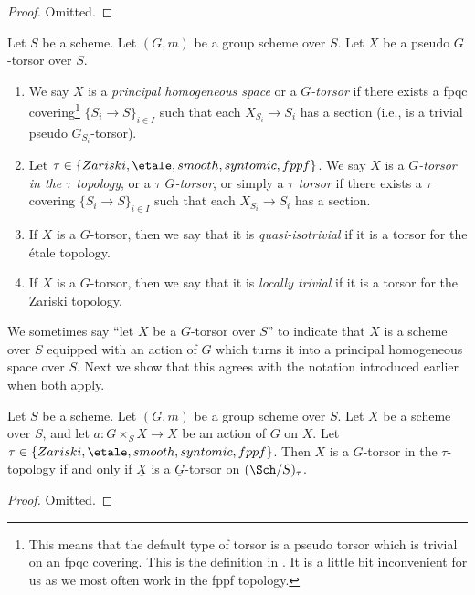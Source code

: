 \begin{proof}
Omitted.
\end{proof}

\begin{definition}
\label{definition-principal-homogeneous-space}
Let $S$ be a scheme.
Let $(G, m)$ be a group scheme over $S$.
Let $X$ be a pseudo $G$-torsor over $S$.
\begin{enumerate}
\item We say $X$ is a {\it principal homogeneous space}
or a {\it $G$-torsor} if there exists a fpqc covering\footnote{This means
that the default type of torsor is a pseudo torsor which is trivial on an
fpqc covering. This is the definition in \cite[Expos\'e IV, 6.5]{SGA3}.
It is a little bit inconvenient for us as we most often work in the fppf
topology.}
$\{S_i \to S\}_{i \in I}$ such that each
$X_{S_i} \to S_i$ has a section (i.e., is a trivial pseudo $G_{S_i}$-torsor).
\item Let $\tau \in \{Zariski, \etale, smooth, syntomic, fppf\}$.
We say $X$ is a {\it $G$-torsor in the $\tau$ topology}, or a
{\it $\tau$ $G$-torsor}, or simply a {\it $\tau$ torsor}
if there exists a $\tau$ covering $\{S_i \to S\}_{i \in I}$
such that each $X_{S_i} \to S_i$ has a section.
\item If $X$ is a $G$-torsor, then we say that it is
{\it quasi-isotrivial} if it is a torsor for the \'etale topology.
\item If $X$ is a $G$-torsor, then we say that it is
{\it locally trivial} if it is a torsor for the Zariski topology.
\end{enumerate}
\end{definition}

\noindent
We sometimes say ``let $X$ be a $G$-torsor over $S$'' to indicate that
$X$ is a scheme over $S$ equipped with an action of $G$ which turns it
into a principal homogeneous space over $S$.
Next we show that this agrees with the notation introduced earlier
when both apply.

\begin{lemma}
\label{lemma-torsor}
Let $S$ be a scheme.
Let $(G, m)$ be a group scheme over $S$.
Let $X$ be a scheme over $S$, and let
$a : G \times_S X \to X$ be an action of $G$ on $X$.
Let $\tau \in \{Zariski, \etale, smooth, syntomic, fppf\}$.
Then $X$ is a $G$-torsor in the $\tau$-topology if and only if
$\underline{X}$ is a $\underline{G}$-torsor on $(\Sch/S)_\tau$.
\end{lemma}

\begin{proof}
Omitted.
\end{proof}

